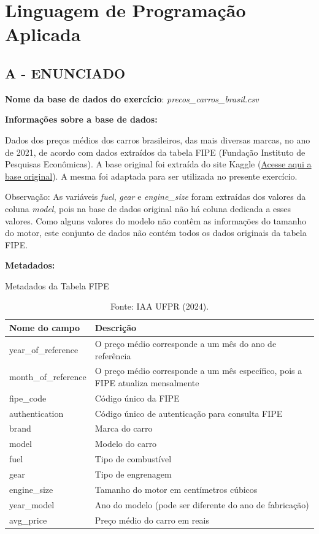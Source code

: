 \label{ap:ap02}
\chapter{Linguagem de Programação Aplicada}

\section*{\textbf{A - ENUNCIADO}}
\textbf{Nome da base de dados do exercício}: \textit{precos\_carros\_brasil.csv}

\textbf{Informações sobre a base de dados: }

Dados dos preços médios dos carros brasileiros, das mais diversas marcas, no ano de 2021, de acordo com dados extraídos
da tabela FIPE (Fundação Instituto de Pesquisas Econômicas). A base original foi extraída do site Kaggle
(\href{https://www.kaggle.com/datasets/vagnerbessa/average-car-prices-bazil/data}{\textcolor[HTML]{1155CC}{Acesse aqui
a base original}}). A mesma foi adaptada para ser utilizada no presente exercício.

Observação: As variáveis \textit{fuel\hspace{0pt}\hspace{0pt}}, \textit{gear} e \textit{engine\_size} foram extraídas
dos valores da coluna \textit{model}, pois na base de dados original não há coluna dedicada a esses valores. Como
alguns valores do modelo não contêm as informações do tamanho do motor, este conjunto de dados não contém todos os
dados originais da tabela FIPE.

\textbf{Metadados:}
\begin{table}[H]
\centering
\caption{Metadados da Tabela FIPE}
\begin{tabular}{|p{}|p{}|}
\hline
\textbf{Nome do campo} & \textbf{Descrição} \\
\hline
year\_of\_reference & O preço médio corresponde a um mês do ano de referência \\
\hline
month\_of\_reference & O preço médio corresponde a um mês específico, pois a FIPE atualiza mensalmente \\
\hline
fipe\_code & Código único da FIPE \\
\hline
authentication & Código único de autenticação para consulta FIPE \\
\hline
brand & Marca do carro \\
\hline
model & Modelo do carro \\
\hline
fuel & Tipo de combustível \\
\hline
gear & Tipo de engrenagem \\
\hline
engine\_size & Tamanho do motor em centímetros cúbicos \\
\hline
year\_model & Ano do modelo (pode ser diferente do ano de fabricação) \\
\hline
avg\_price & Preço médio do carro em reais \\
\hline
\end{tabular}
\caption*{Fonte: IAA UFPR (2024).}
\end{table}



